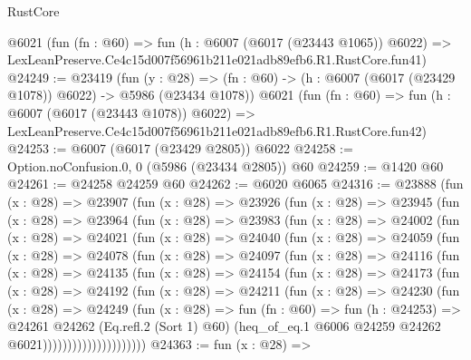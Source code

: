 \begin{lexlean}{RustCore}
\begin{coremodule}
    @6021
    (fun (fn : @60) =>
    fun (h : @6007 (@6017 (@23443 @1065)) @6022) =>
    LexLeanPreserve.Ce4c15d007f56961b211e021adb89efb6.R1.RustCore.fun41)
@24249 := @23419
    (fun (y : @28) =>
    (fn : @60) -> (h : @6007 (@6017 (@23429 @1078)) @6022) -> @5986 (@23434 @1078))
    @6021
    (fun (fn : @60) =>
    fun (h : @6007 (@6017 (@23443 @1078)) @6022) =>
    LexLeanPreserve.Ce4c15d007f56961b211e021adb89efb6.R1.RustCore.fun42)
@24253 := @6007 (@6017 (@23429 @2805)) @6022
@24258 := Option.noConfusion.{0, 0} (@5986 (@23434 @2805)) @60
@24259 := @1420 @60
@24261 := @24258 @24259 @60
@24262 := @6020 @6065
@24316 := @23888
    (fun (x : @28) =>
    @23907
      (fun (x : @28) =>
      @23926
        (fun (x : @28) =>
        @23945
          (fun (x : @28) =>
          @23964
            (fun (x : @28) =>
            @23983
              (fun (x : @28) =>
              @24002
                (fun (x : @28) =>
                @24021
                  (fun (x : @28) =>
                  @24040
                    (fun (x : @28) =>
                    @24059
                      (fun (x : @28) =>
                      @24078
                        (fun (x : @28) =>
                        @24097
                          (fun (x : @28) =>
                          @24116
                            (fun (x : @28) =>
                            @24135
                              (fun (x : @28) =>
                              @24154
                                (fun (x : @28) =>
                                @24173
                                  (fun (x : @28) =>
                                  @24192
                                    (fun (x : @28) =>
                                    @24211
                                      (fun (x : @28) =>
                                      @24230
                                        (fun (x : @28) =>
                                        @24249
                                          (fun (x : @28) =>
                                          fun (fn : @60) =>
                                          fun (h : @24253) =>
                                          @24261
                                            @24262
                                            (Eq.refl.{2} (Sort 1) @60)
                                            (heq_of_eq.{1}
                                              @6006
                                              @24259
                                              @24262
                                              @6021)))))))))))))))))))))
@24363 := fun (x : @28) =>

\end{coremodule}
\end{lexlean}
